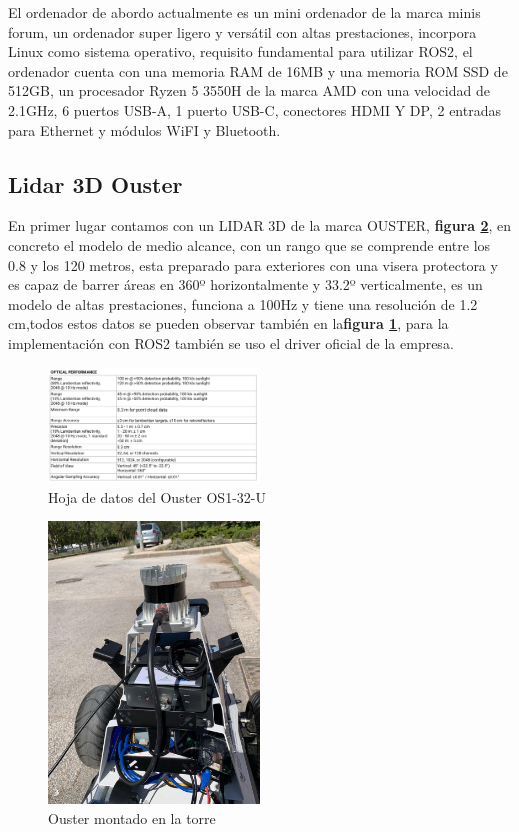 El ordenador de abordo actualmente es un mini ordenador de la marca minis forum, un ordenador super ligero y versátil con altas 
prestaciones, incorpora Linux como sistema operativo, requisito fundamental para utilizar ROS2, el ordenador cuenta con una 
memoria RAM de 16MB y una memoria ROM SSD de 512GB, un procesador Ryzen 5 3550H de la marca AMD con una velocidad de 2.1GHz, 6 puertos USB-A, 
1 puerto USB-C, conectores HDMI Y DP, 2 entradas para Ethernet y módulos WiFI y Bluetooth.

\subsection{Lidar 3D Ouster}
En primer lugar contamos con un LIDAR 3D de la marca OUSTER, \textbf{figura \ref{fig:ouster_hunter}}, en concreto el 
modelo de medio alcance, con un rango que se comprende entre los 0.8 y los 120 metros, esta preparado para exteriores con una visera 
protectora y es capaz de barrer áreas en 360º horizontalmente y 33.2º verticalmente, es un modelo de altas prestaciones, funciona a 
100Hz y tiene una resolución de 1.2 cm,todos estos datos se pueden observar también en la\textbf{figura \ref{fig:datasheet_ouster}}, 
para la implementación con ROS2 también se uso el driver oficial de la empresa. 

\begin{figure}[h]
    \centering
    \includegraphics[width=0.5\textwidth]{images/osuter_datasheet.png}
    \caption{Hoja de datos del Ouster OS1-32-U}
    \label{fig:datasheet_ouster}
\end{figure}

\begin{figure}[H]
    \centering
    \includegraphics[width=0.5\textwidth]{images/ouster_hunter.jpeg}
    \caption{Ouster montado en la torre}
    \label{fig:ouster_hunter}
\end{figure}

